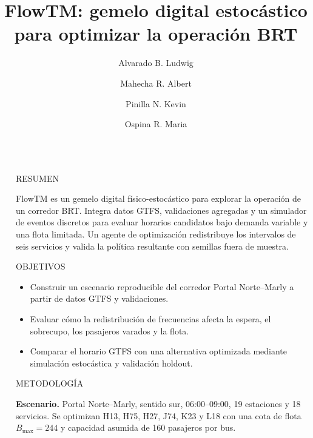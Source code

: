 \documentclass[final]{beamer}
\title{FlowTM: gemelo digital estocástico para optimizar la operación BRT}
\author{Alvarado B. Ludwig \and Mahecha R. Albert \and Pinilla N. Kevin \and Ospina R. Maria}
\newlength{\sepwidth}
\newlength{\colwidth}
\newcommand{\separatorcolumn}{\begin{column}{\sepwidth}\end{column}}
\begin{document}

\begin{frame}[t]
  \begin{columns}[t]
    \separatorcolumn

    \begin{column}{\colwidth}

      \begin{block}{RESUMEN}

        FlowTM es un gemelo digital físico-estocástico para explorar la operación de un corredor BRT. Integra datos GTFS, validaciones agregadas y un simulador de eventos discretos para evaluar horarios candidatos bajo demanda variable y una flota limitada. Un agente de optimización redistribuye los intervalos de seis servicios y valida la política resultante con semillas fuera de muestra.

      \end{block}

      \begin{block}{OBJETIVOS}

        \begin{itemize}
          \item Construir un escenario reproducible del corredor Portal Norte--Marly a partir de datos GTFS y validaciones.
          \item Evaluar cómo la redistribución de frecuencias afecta la espera, el sobrecupo, los pasajeros varados y la flota.
          \item Comparar el horario GTFS con una alternativa optimizada mediante simulación estocástica y validación holdout.
        \end{itemize}

      \end{block}

      \begin{alertblock}{METODOLOGÍA}

        \textbf{Escenario.} Portal Norte--Marly, sentido sur, 06:00--09:00, 19 estaciones y 18 servicios. Se optimizan H13, H75, H27, J74, K23 y L18 con una cota de flota $B_{\max}=244$ y capacidad asumida de 160 pasajeros por bus.


\end{alertblock}
\end{column}
\end{columns}
\end{frame}
\end{document}
